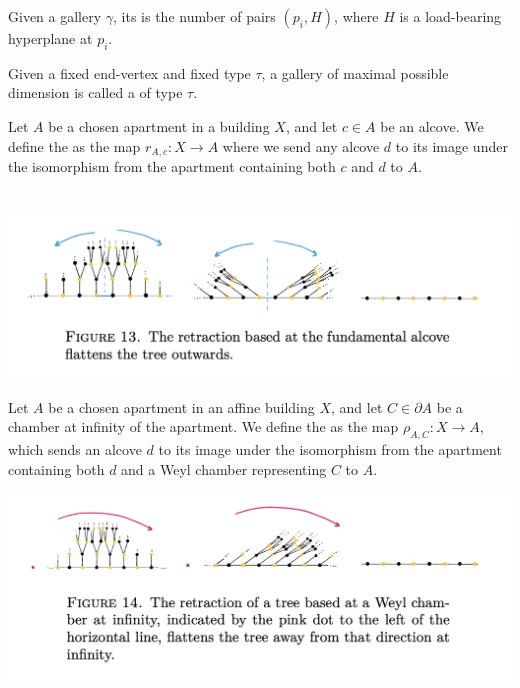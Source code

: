 \documentclass[11pt]{article}
\begin{document}
\begin{definition}
    Given a gallery $\gamma$, its  is the number of pairs $(p_i,H)$, where $H$ is a load-bearing hyperplane at $p_i$. 
\end{definition}

\begin{definition}
    Given a fixed end-vertex and fixed type $\tau$, a gallery of maximal possible dimension is called a  of type $\tau$. 
\end{definition}


\begin{definition}
    Let $A$ be a chosen apartment in a building $X$, and let $c\in A$ be an alcove. We define the  as the map $r_{A,c}:X\longrightarrow A$ where we send any alcove $d$ to its image under the isomorphism from the apartment containing both $c$ and $d$ to $A$. 
\end{definition}

\\
\includegraphics[scale=0.6]{Screenshot 2023-02-15 at 13.32.45.png}
\begin{definition}
    Let $A$ be a chosen apartment in an affine building $X$, and let $C\in \partial A$ be a chamber at infinity of the apartment. We define the  as the map $\rho_{A,C}:X\longrightarrow A$, which sends an alcove $d$ to its image under the isomorphism from the apartment containing both $d$ and a Weyl chamber representing $C$ to $A$. 
\end{definition}


\includegraphics[scale=0.6]{Screenshot 2023-02-15 at 13.31.58.png}
\end{document}
